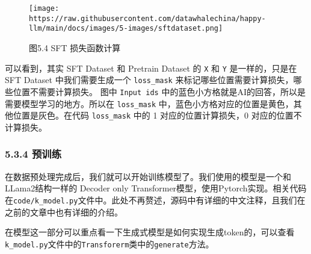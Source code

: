 \documentclass[
]{article}
\begin{document}
\begin{figure}[htbp]\centering
\texttt{[image: https://raw.githubusercontent.com/datawhalechina/happy-llm/main/docs/images/5-images/sftdataset.png]}
\caption{图5.4 SFT 损失函数计算}
\end{figure}

可以看到，其实 SFT Dataset 和 Pretrain Dataset 的 \texttt{X} 和
\texttt{Y} 是一样的，只是在 SFT Dataset 中我们需要生成一个
\texttt{loss\_mask} 来标记哪些位置需要计算损失，哪些位置不需要计算损失。
图中 \texttt{Input\ ids}
中的蓝色小方格就是AI的回答，所以是需要模型学习的地方。所以在
\texttt{loss\_mask}
中，蓝色小方格对应的位置是黄色，其他位置是灰色。在代码
\texttt{loss\_mask} 中的 1 对应的位置计算损失，0 对应的位置不计算损失。

\subsubsection{5.3.4 预训练}\label{ux9884ux8badux7ec3}

在数据预处理完成后，我们就可以开始训练模型了。我们使用的模型是一个和LLama2结构一样的
Decoder only
Transformer模型，使用Pytorch实现。相关代码在\texttt{code/k\_model.py}文件中。此处不再赘述，源码中有详细的中文注释，且我们在之前的文章中也有详细的介绍。

在模型这一部分可以重点看一下生成式模型是如何实现生成token的，可以查看\texttt{k\_model.py}文件中的\texttt{Transforerm}类中的\texttt{generate}方法。
\end{document}
